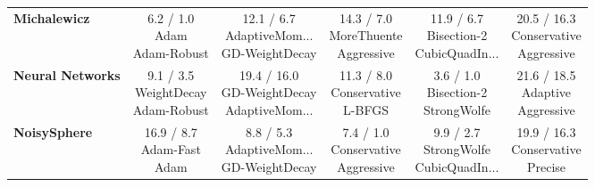 \begin{longtable}{lccccc}
\textbf{Michalewicz} & \cellcolor{bestgreen!30} \makecell{6.2 / 1.0 \\ \scriptsize{Adam} \\ \scriptsize{Adam-Robust}}&  \makecell{12.1 / 6.7 \\ \scriptsize{AdaptiveMom...} \\ \scriptsize{GD-WeightDecay}}&  \makecell{14.3 / 7.0 \\ \scriptsize{MoreThuente} \\ \scriptsize{Aggressive}}&  \makecell{11.9 / 6.7 \\ \scriptsize{Bisection-2} \\ \scriptsize{CubicQuadIn...}}& \cellcolor{worstred!20} \makecell{20.5 / 16.3 \\ \scriptsize{Conservative} \\ \scriptsize{Aggressive}} \\
\textbf{Neural Networks} &  \makecell{9.1 / 3.5 \\ \scriptsize{WeightDecay} \\ \scriptsize{Adam-Robust}}&  \makecell{19.4 / 16.0 \\ \scriptsize{GD-WeightDecay} \\ \scriptsize{AdaptiveMom...}}&  \makecell{11.3 / 8.0 \\ \scriptsize{Conservative} \\ \scriptsize{L-BFGS}}& \cellcolor{bestgreen!30} \makecell{3.6 / 1.0 \\ \scriptsize{Bisection-2} \\ \scriptsize{StrongWolfe}}& \cellcolor{worstred!20} \makecell{21.6 / 18.5 \\ \scriptsize{Adaptive} \\ \scriptsize{Aggressive}} \\
\textbf{NoisySphere} &  \makecell{16.9 / 8.7 \\ \scriptsize{Adam-Fast} \\ \scriptsize{Adam}}&  \makecell{8.8 / 5.3 \\ \scriptsize{AdaptiveMom...} \\ \scriptsize{GD-WeightDecay}}& \cellcolor{bestgreen!30} \makecell{7.4 / 1.0 \\ \scriptsize{Conservative} \\ \scriptsize{Aggressive}}&  \makecell{9.9 / 2.7 \\ \scriptsize{StrongWolfe} \\ \scriptsize{CubicQuadIn...}}& \cellcolor{worstred!20} \makecell{19.9 / 16.3 \\ \scriptsize{Conservative} \\ \scriptsize{Precise}} \\

\end{longtable}
